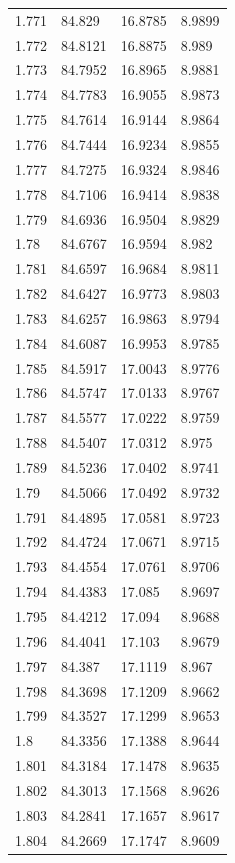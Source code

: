 \begin{tabular}{llll}
1.771 & 84.829 & 16.8785 & 8.9899 \\
1.772 & 84.8121 & 16.8875 & 8.989 \\
1.773 & 84.7952 & 16.8965 & 8.9881 \\
1.774 & 84.7783 & 16.9055 & 8.9873 \\
1.775 & 84.7614 & 16.9144 & 8.9864 \\
1.776 & 84.7444 & 16.9234 & 8.9855 \\
1.777 & 84.7275 & 16.9324 & 8.9846 \\
1.778 & 84.7106 & 16.9414 & 8.9838 \\
1.779 & 84.6936 & 16.9504 & 8.9829 \\
1.78 & 84.6767 & 16.9594 & 8.982 \\
1.781 & 84.6597 & 16.9684 & 8.9811 \\
1.782 & 84.6427 & 16.9773 & 8.9803 \\
1.783 & 84.6257 & 16.9863 & 8.9794 \\
1.784 & 84.6087 & 16.9953 & 8.9785 \\
1.785 & 84.5917 & 17.0043 & 8.9776 \\
1.786 & 84.5747 & 17.0133 & 8.9767 \\
1.787 & 84.5577 & 17.0222 & 8.9759 \\
1.788 & 84.5407 & 17.0312 & 8.975 \\
1.789 & 84.5236 & 17.0402 & 8.9741 \\
1.79 & 84.5066 & 17.0492 & 8.9732 \\
1.791 & 84.4895 & 17.0581 & 8.9723 \\
1.792 & 84.4724 & 17.0671 & 8.9715 \\
1.793 & 84.4554 & 17.0761 & 8.9706 \\
1.794 & 84.4383 & 17.085 & 8.9697 \\
1.795 & 84.4212 & 17.094 & 8.9688 \\
1.796 & 84.4041 & 17.103 & 8.9679 \\
1.797 & 84.387 & 17.1119 & 8.967 \\
1.798 & 84.3698 & 17.1209 & 8.9662 \\
1.799 & 84.3527 & 17.1299 & 8.9653 \\
1.8 & 84.3356 & 17.1388 & 8.9644 \\
1.801 & 84.3184 & 17.1478 & 8.9635 \\
1.802 & 84.3013 & 17.1568 & 8.9626 \\
1.803 & 84.2841 & 17.1657 & 8.9617 \\
1.804 & 84.2669 & 17.1747 & 8.9609 \\

\end{tabular}

